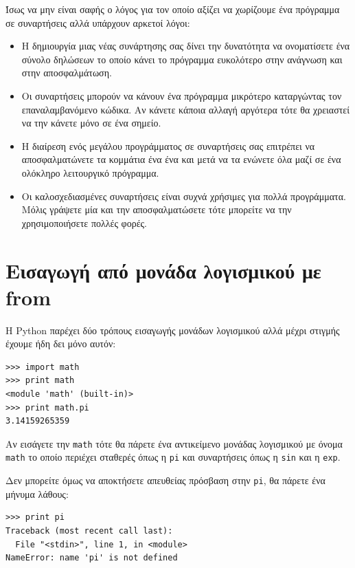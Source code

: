 \documentclass[10pt]{book}
\begin{document}
Ίσως να μην είναι σαφής ο λόγος για τον οποίο αξίζει να χωρίζουμε
ένα πρόγραμμα σε συναρτήσεις αλλά υπάρχουν αρκετοί λόγοι:


\begin{itemize}

\item Η δημιουργία μιας νέας συνάρτησης σας δίνει την δυνατότητα να ονοματίσετε 
ένα σύνολο δηλώσεων το οποίο κάνει το πρόγραμμα ευκολότερο στην ανάγνωση
και στην αποσφαλμάτωση.


\item Οι συναρτήσεις μπορούν να κάνουν ένα πρόγραμμα μικρότερο καταργώντας
τον επαναλαμβανόμενο κώδικα. Αν κάνετε κάποια αλλαγή αργότερα τότε θα χρειαστεί
να την κάνετε μόνο σε ένα σημείο.


\item Η διαίρεση ενός μεγάλου προγράμματος σε συναρτήσεις σας επιτρέπει να
αποσφαλματώνετε τα κομμάτια ένα ένα και μετά να τα ενώνετε όλα μαζί 
σε ένα ολόκληρο λειτουργικό πρόγραμμα.


\item Οι καλοσχεδιασμένες συναρτήσεις είναι συχνά χρήσιμες για πολλά προγράμματα. Μόλις γράψετε μία και την αποσφαλματώσετε τότε μπορείτε να την χρησιμοποιήσετε πολλές φορές.


\end{itemize}


\section{Εισαγωγή από μονάδα λογισμικού με from}

Η Python παρέχει δύο τρόπους εισαγωγής μονάδων λογισμικού αλλά 
μέχρι στιγμής έχουμε ήδη δει μόνο αυτόν:


\begin{verbatim}
>>> import math
>>> print math
<module 'math' (built-in)>
>>> print math.pi
3.14159265359
\end{verbatim}
%

Αν εισάγετε την {\tt math} τότε θα πάρετε ένα αντικείμενο μονάδας λογισμικού με όνομα {\tt math} το οποίο περιέχει σταθερές όπως η {\tt pi} 
και συναρτήσεις όπως η {\tt sin} και η {\tt exp}.

Δεν μπορείτε όμως να αποκτήσετε απευθείας πρόσβαση στην {\tt pi}, 
θα πάρετε ένα μήνυμα λάθους:


\begin{verbatim}
>>> print pi
Traceback (most recent call last):
  File "<stdin>", line 1, in <module>
NameError: name 'pi' is not defined
\end{verbatim}
%
\end{document}
